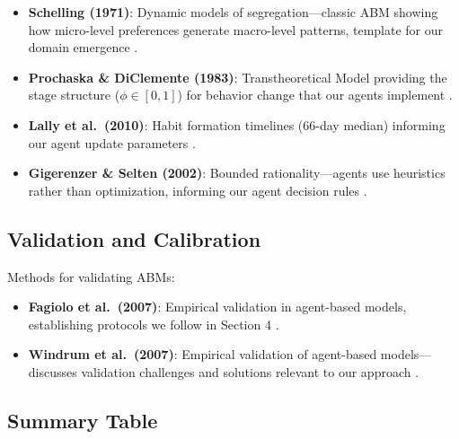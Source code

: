 \begin{itemize}
\item \textbf{Schelling (1971)}: Dynamic models of segregation---classic ABM showing
      how micro-level preferences generate macro-level patterns, template for our
      domain emergence \citep{schelling1971dynamic}.

\item \textbf{Prochaska \& DiClemente (1983)}: Transtheoretical Model providing the
      stage structure ($\phi \in [0,1]$) for behavior change that our agents implement
      \citep{prochaska1983stages}.

\item \textbf{Lally et al.~(2010)}: Habit formation timelines (66-day median) informing
      our agent update parameters \citep{lally2010habits}.

\item \textbf{Gigerenzer \& Selten (2002)}: Bounded rationality---agents use heuristics
      rather than optimization, informing our agent decision rules \citep{gigerenzer2002bounded}.
\end{itemize}

\subsection{Validation and Calibration}

Methods for validating ABMs:

\begin{itemize}
\item \textbf{Fagiolo et al.~(2007)}: Empirical validation in agent-based models,
      establishing protocols we follow in Section 4 \citep{fagiolo2007empirical}.

\item \textbf{Windrum et al.~(2007)}: Empirical validation of agent-based models---
      discusses validation challenges and solutions relevant to our approach
      \citep{windrum2007empirical}.
\end{itemize}

\subsection{Summary Table}

